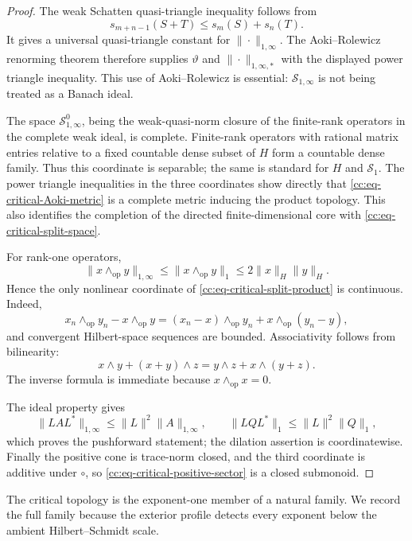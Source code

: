 \documentclass[10pt,reqno]{amsart}
\theoremstyle{plain}
\theoremstyle{definition}
\theoremstyle{remark}
\begin{document}
\begin{proof}
The weak Schatten quasi-triangle inequality follows from
\[
 s_{m+n-1}(S+T)\leq s_m(S)+s_n(T).
\]
It gives a universal quasi-triangle constant for
\(\|\cdot\|_{1,\infty}\).  The Aoki--Rolewicz renorming theorem
\cite{KaltonPeckRoberts84} therefore supplies \(\vartheta\) and
\(\|\cdot\|_{1,\infty,*}\) with the displayed
power triangle inequality.  This use of Aoki--Rolewicz is essential:
\(\mathcal S_{1,\infty}\) is not being treated as a Banach ideal.

The space \(\mathcal S^0_{1,\infty}\), being the weak-quasi-norm closure
of the finite-rank operators in the complete weak ideal, is complete.
Finite-rank operators with rational matrix entries relative to a fixed
countable dense subset of \(H\) form a countable dense family.  Thus this
coordinate is separable; the same is standard for \(H\) and
\(\mathcal S_1\).  The power triangle inequalities in the three
coordinates show directly that \eqref{cc:eq-critical-Aoki-metric} is a
complete metric inducing the product topology.  This also identifies the
completion of the directed finite-dimensional core with
\eqref{cc:eq-critical-split-space}.

For rank-one operators,
\begin{equation}
 \|x\wedge_{\mathrm{op}}y\|_{1,\infty}
 \leq\|x\wedge_{\mathrm{op}}y\|_1
 \leq2\|x\|_H\|y\|_H.
 \label{cc:eq-wedge-trace-bound}
\end{equation}
Hence the only nonlinear coordinate of \eqref{cc:eq-critical-split-product}
is continuous.  Indeed,
\[
 x_n\wedge_{\mathrm{op}}y_n-x\wedge_{\mathrm{op}}y
 =(x_n-x)\wedge_{\mathrm{op}}y_n
   +x\wedge_{\mathrm{op}}(y_n-y),
\]
and convergent Hilbert-space sequences are bounded.  Associativity follows
from bilinearity:
\[
 x\wedge y+(x+y)\wedge z
 =y\wedge z+x\wedge(y+z).
\]
The inverse formula is immediate because
\(x\wedge_{\mathrm{op}}x=0\).

The ideal property gives
\[
 \|LAL^*\|_{1,\infty}\leq\|L\|^2\|A\|_{1,\infty},
 \qquad
 \|LQL^*\|_1\leq\|L\|^2\|Q\|_1,
\]
which proves the pushforward statement; the dilation assertion is
coordinatewise.  Finally the positive cone is trace-norm closed, and the
third coordinate is additive under \(\circ\), so
\eqref{cc:eq-critical-positive-sector} is a closed submonoid.
\end{proof}

The critical topology is the exponent-one member of a natural family.  We
record the full family because the exterior profile detects every exponent
below the ambient Hilbert--Schmidt scale.
\end{document}

